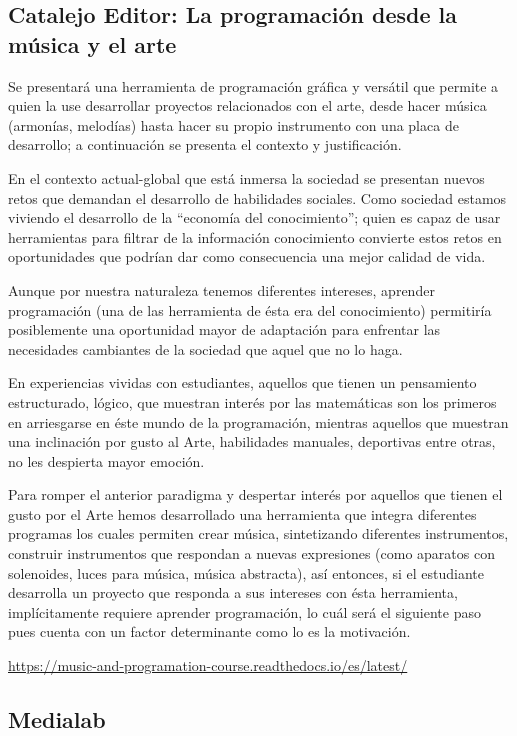 \subsection*{Catalejo Editor: La programación desde la música y el arte}

Se presentará una herramienta de programación gráfica y versátil que permite a quien la use desarrollar proyectos relacionados con el arte, desde hacer música (armonías, melodías) hasta hacer su propio instrumento con una placa de desarrollo; a continuación se presenta el contexto y justificación.

En  el contexto actual-global que está inmersa la sociedad se presentan nuevos retos que demandan el desarrollo de habilidades sociales. Como sociedad estamos viviendo el desarrollo de la “economía del conocimiento”; quien es capaz de usar herramientas para filtrar de la información conocimiento convierte estos retos en oportunidades que podrían dar como  consecuencia una mejor calidad de vida.

Aunque por nuestra naturaleza tenemos diferentes intereses, aprender programación (una de las herramienta de ésta era del conocimiento) permitiría posiblemente una oportunidad mayor de adaptación para enfrentar las necesidades cambiantes de la sociedad que aquel que no lo haga.

En experiencias vividas con estudiantes, aquellos que tienen un pensamiento estructurado, lógico, que muestran interés por las matemáticas son los primeros en arriesgarse en éste mundo de la programación, mientras aquellos que muestran una inclinación por gusto al Arte, habilidades manuales, deportivas entre otras, no les despierta mayor emoción.

Para romper el anterior paradigma y despertar interés por aquellos que tienen el gusto por el Arte hemos desarrollado una herramienta que integra diferentes programas los cuales permiten crear música, sintetizando diferentes instrumentos, construir instrumentos que respondan a nuevas expresiones (como aparatos con solenoides, luces para música, música abstracta), así entonces, si el estudiante desarrolla un proyecto que responda a sus intereses con ésta herramienta, implícitamente requiere aprender programación, lo cuál será el siguiente paso pues cuenta con un factor determinante como lo es la motivación.

\url{https://music-and-programation-course.readthedocs.io/es/latest/}

\subsection*{Medialab}

